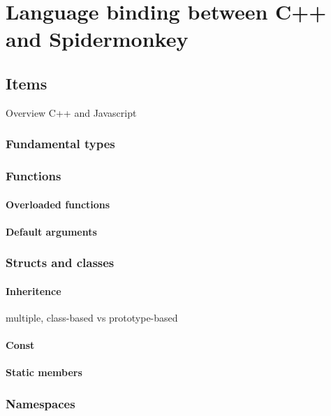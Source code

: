 \chapter{Language binding between C++ and Spidermonkey}
\label{chap:LanguageBindingCPPJS}

\section{Items}

Overview C++ and Javascript

\subsection{Fundamental types}

\subsection{Functions}

\subsubsection{Overloaded functions}

\subsubsection{Default arguments}

\subsection{Structs and classes}

\subsubsection{Inheritence}

multiple, class-based vs prototype-based

\subsubsection{Const}

\subsubsection{Static members}

\subsection{Namespaces}

